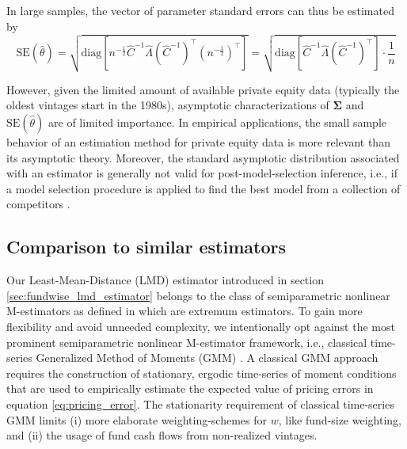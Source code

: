 \documentclass[12pt]{article}
\begin{document}
In large samples, the vector of parameter standard errors can thus be estimated by
\[
\mathrm{SE}(\hat{\theta}) = 
\sqrt{
	\mathrm{diag} \left[
	n^{-\frac{1}{2}}
	\hat{C}^{-1} \hat{\Lambda} (\hat{C}^{-1})^\top
	(n^{-\frac{1}{2}})^\top
	\right] 
}
=
\sqrt{
	\mathrm{diag} \left[
	\hat{C}^{-1} \hat{\Lambda} (\hat{C}^{-1})^\top
	\right] 
	\cdot \frac{1}{n}
}
\]

However, given the limited amount of available private equity data (typically the oldest vintages start in the 1980s), asymptotic characterizations of $\mathbf{\Sigma}$ and $\mathrm{SE}(\hat{\theta})$ are of limited importance. 
In empirical applications, the small sample behavior of an estimation method for private equity data is more relevant than its asymptotic theory.
Moreover, the standard asymptotic distribution associated with an estimator is generally not valid for post-model-selection inference, i.e., if a model selection procedure is applied to find the best model from a collection of competitors \citep{LP05}.


\subsection{Comparison to similar estimators}
\label{sec:comparison_to_similar_estimators}

Our Least-Mean-Distance (LMD) estimator introduced in section \ref{sec:fundwise_lmd_estimator} belongs to the class of semiparametric nonlinear M-estimators as defined in \cite{PP97} which are extremum estimators.
To gain more flexibility and avoid unneeded complexity, we intentionally opt against the most prominent semiparametric nonlinear M-estimator framework, i.e., classical time-series Generalized Method of Moments (GMM) \citep{H82,H12}.
A classical GMM approach requires the construction of stationary, ergodic time-series of moment conditions that are used to empirically estimate the expected value of pricing errors in equation \ref{eq:pricing_error}.
The stationarity requirement of classical time-series GMM limits (i) more elaborate weighting-schemes for $w$, like fund-size weighting, and (ii) the usage of fund cash flows from non-realized vintages.
\end{document}
